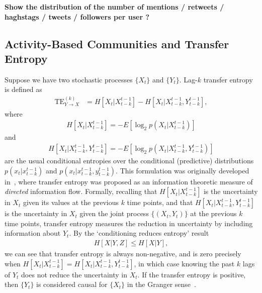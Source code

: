 \textbf{Show the distribution of the number of mentions / retweets / haghstags / tweets / followers per user ?}

\subsection{Activity-Based Communities and Transfer Entropy}

Suppose we have two stochastic processes $\{X_{t}\}$ and $\{ Y_{t}\}$. Lag-$k$ transfer entropy is defined as 
\begin{align}
	\text{TE}_{Y \to X}^{(k)} &= H\left[X_{t} | X_{t-k}^{t-1}\right] - H\left[X_{t} | X_{t-k}^{t-1}, Y_{t-k}^{t-1}\right],
\end{align}
where
\begin{align}
	H\left[X_{t} | X_{t-k}^{t-1}\right] = - E\left[ \log_{2} p(X_{t} | X_{t-k}^{t-1}) \right]
\end{align}
and 
\begin{align}
	H\left[X_{t} | X_{t-k}^{t-1}, Y_{t-k}^{t-1}\right] = - E\left[ \log_{2} p(X_{t} | X_{t-k}^{t-1}, Y_{t-k}^{t-1}) \right]
\end{align}
are the usual conditional entropies over the conditional (predictive) distributions $p(x_{t} | x_{t-k}^{t-1})$ and $p(x_{t} | x_{t-k}^{t-1}, y_{t-k}^{t-1})$. This formulation was originally developed in~\cite{schreiber2000measuring}, where transfer entropy was proposed as an information theoretic measure of \emph{directed} information flow. Formally, recalling that $H\left[X_{t} | X_{t-k}^{t-1}\right]$ is the uncertainty in $X_{t}$ given its values at the previous $k$ time points, and that $H\left[X_{t} | X_{t-k}^{t-1}, Y_{t-k}^{t-1}\right]$ is the uncertainty in $X_{t}$ given the joint process $\{(X_{t}, Y_{t})\}$ at the previous $k$ time points, transfer entropy measures the reduction in uncertainty by including information about $Y_{t}.$ By the `conditioning reduces entropy' result~\cite{cover2012elements}
\begin{align}
	H[X | Y, Z] \leq H[X | Y],
\end{align}
we can see that transfer entropy is always non-negative, and is zero precisely when $H\left[X_{t} | X_{t-k}^{t-1}\right] = H\left[X_{t} | X_{t-k}^{t-1}, Y_{t-k}^{t-1}\right]$, in which case knowing the past $k$ lags of $Y_{t}$ does not reduce the uncertainty in $X_{t}$. If the transfer entropy is positive, then $\{ Y_{t}\}$ is considered causal for $\{ X_{t}\}$ in the Granger sense~\cite{granger1963economic, barnett2012transfer}.

